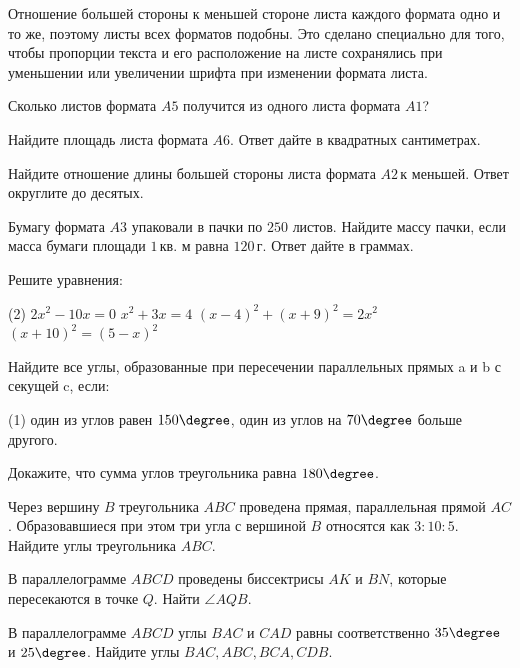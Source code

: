 \begin{homework}[number=1]
\begin{listofex}
\begin{center}
		\end{center}
		Отношение большей стороны к меньшей стороне листа каждого формата одно и то же, поэтому листы всех форматов подобны. Это сделано специально для того, чтобы пропорции текста и его расположение на листе сохранялись при уменьшении или увеличении шрифта при изменении формата листа.
		\item Сколько листов формата \( A5 \) получится из одного листа формата \( A1 \)?
		\item Найдите площадь листа формата \( A6 \). Ответ дайте в квадратных сантиметрах.
		\item Найдите отношение длины большей стороны листа формата \( A2 \) к меньшей. Ответ округлите до десятых.
		\item Бумагу формата \( A3 \) упаковали в пачки по \( 250 \) листов. Найдите массу пачки, если масса бумаги площади \( 1 \) кв. м равна \( 120 \) г. Ответ дайте в граммах.
		\item Решите уравнения:
		\begin{tasks}(2)
			\task \( 2x^2-10x=0 \)
			\task \( x^2+3x=4 \)
			\task \( (x-4)^2+(x+9)^2=2x^2 \)
			\task \( (x+10)^2=(5-x)^2 \)
		\end{tasks}
	\end{listofex}
\end{homework}

\begin{class}[number=2]
	\begin{listofex}
		\item Найдите все углы, образованные при пересечении параллельных прямых a и b с секущей c, если:
		\begin{tasks}(1)
			\task один из углов равен \(150 \degree\),
			\task один из углов на \(70 \degree\) больше другого.
		\end{tasks}
		\item Докажите, что сумма углов треугольника равна \(180 \degree\).
		\item Через вершину \(B\) треугольника \(ABC\) проведена прямая, параллельная прямой \(AC\). Образовавшиеся при этом три угла с вершиной \(B\) относятся как \(3:10:5\). Найдите углы треугольника \(ABC\).
		\item В параллелограмме \(ABCD\) проведены биссектрисы \(AK\) и \(BN\), которые пересекаются в точке \(Q\). Найти \(\angle AQB\).
		\item В параллелограмме \(ABCD\) углы \(BAC\) и \(CAD\) равны соответственно \(35 \degree\) и \(25 \degree\). Найдите углы \(BAC, ABC, BCA, CDB\).
	\end{listofex}
\end{class}

